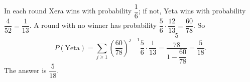 In each round Xera wins with probability $\dfrac16$; if not, Yeta wins with probability $\dfrac4{52}=\dfrac1{13}$. A round with no winner has probability $\dfrac56\cdot\dfrac{12}{13}=\dfrac{60}{78}$. So
\[P(\text{Yeta})=\sum_{j\ge1}\left(\dfrac{60}{78}\right)^{j-1}\dfrac56\cdot\dfrac1{13}=\dfrac{\dfrac5{78}}{1-\dfrac{60}{78}}=\dfrac5{18}.\]
The answer is $\boxed{\dfrac5{18}}$.
